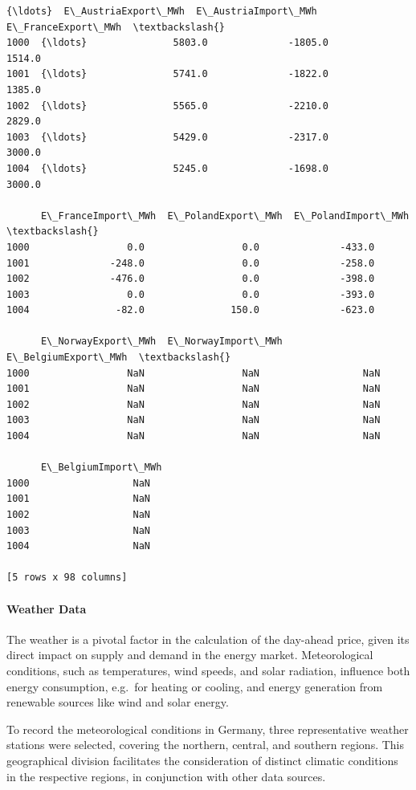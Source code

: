 \documentclass[a4paper]{article}
\begin{document}
\begin{tcolorbox}[breakable, size=fbox, boxrule=.5pt, pad at break*=1mm, opacityfill=0]
\begin{small}
\begin{Verbatim}[commandchars=\\\{\}]
      {\ldots}  E\_AustriaExport\_MWh  E\_AustriaImport\_MWh  E\_FranceExport\_MWh  \textbackslash{}
1000  {\ldots}               5803.0              -1805.0              1514.0
1001  {\ldots}               5741.0              -1822.0              1385.0
1002  {\ldots}               5565.0              -2210.0              2829.0
1003  {\ldots}               5429.0              -2317.0              3000.0
1004  {\ldots}               5245.0              -1698.0              3000.0

      E\_FranceImport\_MWh  E\_PolandExport\_MWh  E\_PolandImport\_MWh  \textbackslash{}
1000                 0.0                 0.0              -433.0
1001              -248.0                 0.0              -258.0
1002              -476.0                 0.0              -398.0
1003                 0.0                 0.0              -393.0
1004               -82.0               150.0              -623.0

      E\_NorwayExport\_MWh  E\_NorwayImport\_MWh  E\_BelgiumExport\_MWh  \textbackslash{}
1000                 NaN                 NaN                  NaN
1001                 NaN                 NaN                  NaN
1002                 NaN                 NaN                  NaN
1003                 NaN                 NaN                  NaN
1004                 NaN                 NaN                  NaN

      E\_BelgiumImport\_MWh
1000                  NaN
1001                  NaN
1002                  NaN
1003                  NaN
1004                  NaN

[5 rows x 98 columns]
\end{Verbatim}
\end{small}
\end{tcolorbox}
        
    \paragraph{Weather Data}\label{weather-data}

The weather is a pivotal factor in the calculation of the day-ahead
price, given its direct impact on supply and demand in the energy
market. Meteorological conditions, such as temperatures, wind speeds,
and solar radiation, influence both energy consumption, e.g.~for heating
or cooling, and energy generation from renewable sources like wind and
solar energy.

To record the meteorological conditions in Germany, three representative
weather stations were selected, covering the northern, central, and
southern regions. This geographical division facilitates the
consideration of distinct climatic conditions in the respective regions,
in conjunction with other data sources.
\end{document}
